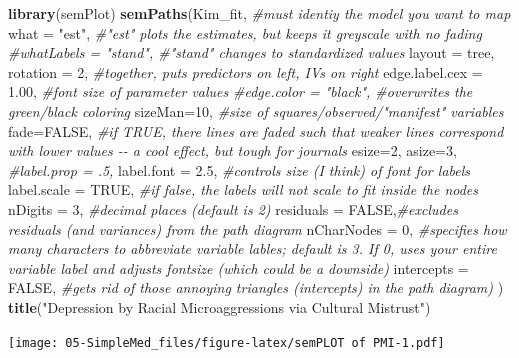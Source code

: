\documentclass[
  11pt,
]{book}
\newenvironment{Shaded}{\begin{snugshade}}{\end{snugshade}}
\newcommand{\AttributeTok}[1]{\textcolor[rgb]{0.27,0.27,0.27}{#1}}
\newcommand{\CommentTok}[1]{\textcolor[rgb]{0.37,0.37,0.37}{\textit{#1}}}
\newcommand{\ConstantTok}[1]{\textcolor[rgb]{0.37,0.37,0.37}{#1}}
\newcommand{\DecValTok}[1]{\textcolor[rgb]{0.06,0.06,0.06}{#1}}
\newcommand{\FloatTok}[1]{\textcolor[rgb]{0.06,0.06,0.06}{#1}}
\newcommand{\FunctionTok}[1]{\textcolor[rgb]{0.27,0.27,0.27}{\textbf{#1}}}
\newcommand{\NormalTok}[1]{#1}
\newcommand{\StringTok}[1]{\textcolor[rgb]{0.5,0.5,0.5}{#1}}
\begin{document}
\begin{Shaded}
\begin{Highlighting}[]
\FunctionTok{library}\NormalTok{(semPlot)}
\FunctionTok{semPaths}\NormalTok{(Kim\_fit, }\CommentTok{\#must identiy the model you want to map}
         \AttributeTok{what =} \StringTok{"est"}\NormalTok{, }\CommentTok{\#"est" plots the estimates, but keeps it greyscale with no fading}
         \CommentTok{\#whatLabels = "stand", \#"stand" changes to standardized values}
         \AttributeTok{layout =} \StringTok{\textquotesingle{}tree\textquotesingle{}}\NormalTok{, }\AttributeTok{rotation =} \DecValTok{2}\NormalTok{, }\CommentTok{\#together, puts predictors on left, IVs on right }
         \AttributeTok{edge.label.cex =} \FloatTok{1.00}\NormalTok{, }\CommentTok{\#font size of parameter values}
         \CommentTok{\#edge.color = "black", \#overwrites the green/black coloring}
         \AttributeTok{sizeMan=}\DecValTok{10}\NormalTok{, }\CommentTok{\#size of squares/observed/"manifest" variables}
         \AttributeTok{fade=}\ConstantTok{FALSE}\NormalTok{, }\CommentTok{\#if TRUE, there lines are faded such that weaker lines correspond with lower values {-}{-} a cool effect, but tough for journals}
         \AttributeTok{esize=}\DecValTok{2}\NormalTok{, }
         \AttributeTok{asize=}\DecValTok{3}\NormalTok{,}
         \CommentTok{\#label.prop = .5,}
         \AttributeTok{label.font =} \FloatTok{2.5}\NormalTok{, }\CommentTok{\#controls size (I think) of font for labels}
         \AttributeTok{label.scale =} \ConstantTok{TRUE}\NormalTok{, }\CommentTok{\#if false, the labels will not scale to fit inside the nodes}
         \AttributeTok{nDigits =} \DecValTok{3}\NormalTok{, }\CommentTok{\#decimal places (default is 2)}
         \AttributeTok{residuals =} \ConstantTok{FALSE}\NormalTok{,}\CommentTok{\#excludes residuals (and variances) from the path diagram}
         \AttributeTok{nCharNodes =} \DecValTok{0}\NormalTok{, }\CommentTok{\#specifies how many characters to abbreviate variable lables; default is 3.  If 0, uses your entire variable label and adjusts fontsize (which could be a downside)}
         \AttributeTok{intercepts =} \ConstantTok{FALSE}\NormalTok{, }\CommentTok{\#gets rid of those annoying triangles (intercepts) in the path diagram)}
\NormalTok{)}
\FunctionTok{title}\NormalTok{(}\StringTok{"Depression by Racial Microaggressions via Cultural Mistrust"}\NormalTok{)}
\end{Highlighting}
\end{Shaded}

\texttt{[image: 05-SimpleMed\_files/figure-latex/semPLOT of PMI-1.pdf]}
\end{document}
